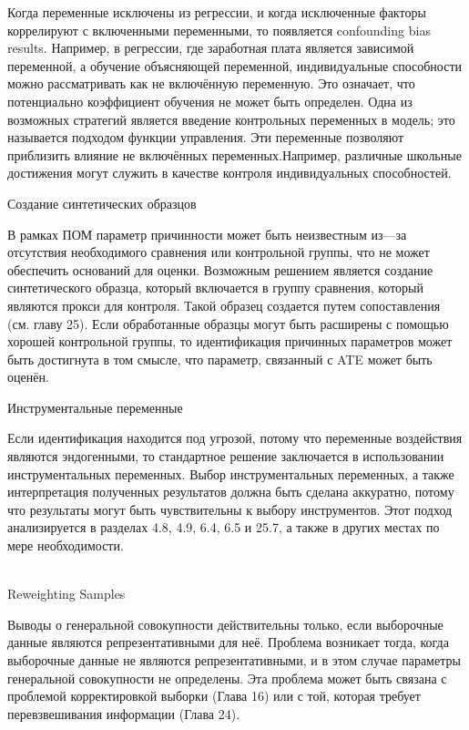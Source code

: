 Когда переменные исключены из регрессии, и когда исключенные факторы коррелируют с включенными переменными, то появляется confounding bias results. Например, в регрессии, где заработная плата является зависимой переменной, а обучение объясняющей переменной, индивидуальные способности можно рассматривать как не включённую переменную. Это означает, что потенциально коэффициент обучения не может быть определен. Одна из возможных стратегий является введение контрольных переменных в модель; это называется подходом функции управления. Эти переменные позволяют приблизить влияние не включённых переменных.Например, различные школьные достижения могут служить в качестве контроля индивидуальных способностей.



\begin{center}
Создание синтетических образцов
\end{center}


В рамках ПОМ параметр причинности может быть неизвестным из---за отсутствия необходимого сравнения или контрольной группы, что не может обеспечить оснований для оценки. Возможным решением является создание синтетического образца, который включается в группу сравнения, который являются прокси для контроля. Такой образец создается путем сопоставления (см. главу 25). Если обработанные образцы могут быть расширены с помощью хорошей контрольной группы, то идентификация причинных параметров может быть достигнута в том смысле, что параметр, связанный с ATE может быть оценён.


\begin{center}
Инструментальные переменные
\end{center}


Если идентификация находится под угрозой, потому что переменные воздействия являются эндогенными, то стандартное решение заключается в использовании инструментальных переменных. Выбор инструментальных переменных, а также интерпретация полученных результатов должна быть сделана аккуратно, потому что результаты могут быть чувствительны к выбору инструментов. Этот подход анализируется в разделах 4.8, 4.9, 6.4, 6.5 и 25.7, а также в других местах по мере необходимости.
\\
\\
\begin{center}
Reweighting Samples
\end{center}


Выводы о генеральной совокупности действительны только, если выборочные данные являются репрезентативными для неё. Проблема возникает тогда, когда выборочные данные не являются репрезентативными, и в этом случае параметры генеральной совокупности не определены. Эта проблема может быть связана с проблемой корректировкой выборки (Глава 16) или с той, которая требует перевзвешивания информации (Глава 24).













